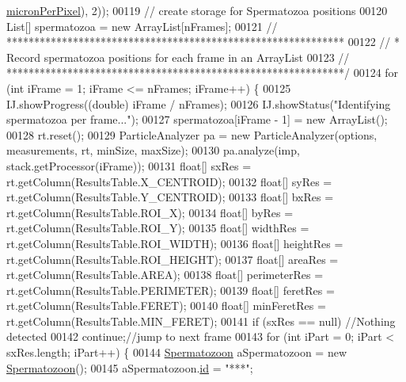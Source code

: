 \begin{DoxyCode}
      \hyperlink{classdata_1_1_params_a19331ee97ef3c422984fc7dff976549e}{micronPerPixel}), 2));
00119     \textcolor{comment}{// create storage for Spermatozoa positions}
00120     List[] spermatozoa = \textcolor{keyword}{new} ArrayList[nFrames];
00121     \textcolor{comment}{// *************************************************************}
00122     \textcolor{comment}{// * Record spermatozoa positions for each frame in an ArrayList}
00123     \textcolor{comment}{// *************************************************************/}
00124     \textcolor{keywordflow}{for} (\textcolor{keywordtype}{int} iFrame = 1; iFrame <= nFrames; iFrame++) \{
00125       IJ.showProgress((\textcolor{keywordtype}{double}) iFrame / nFrames);
00126       IJ.showStatus(\textcolor{stringliteral}{"Identifying spermatozoa per frame..."});      
00127       spermatozoa[iFrame - 1] = \textcolor{keyword}{new} ArrayList();
00128       rt.reset();
00129       ParticleAnalyzer pa = \textcolor{keyword}{new} ParticleAnalyzer(options, measurements, rt, minSize, maxSize);
00130       pa.analyze(imp, stack.getProcessor(iFrame));
00131       \textcolor{keywordtype}{float}[] sxRes = rt.getColumn(ResultsTable.X\_CENTROID);
00132       \textcolor{keywordtype}{float}[] syRes = rt.getColumn(ResultsTable.Y\_CENTROID);
00133       \textcolor{keywordtype}{float}[] bxRes = rt.getColumn(ResultsTable.ROI\_X);
00134       \textcolor{keywordtype}{float}[] byRes = rt.getColumn(ResultsTable.ROI\_Y);
00135       \textcolor{keywordtype}{float}[] widthRes = rt.getColumn(ResultsTable.ROI\_WIDTH);
00136       \textcolor{keywordtype}{float}[] heightRes = rt.getColumn(ResultsTable.ROI\_HEIGHT);
00137       \textcolor{keywordtype}{float}[] areaRes = rt.getColumn(ResultsTable.AREA);
00138       \textcolor{keywordtype}{float}[] perimeterRes = rt.getColumn(ResultsTable.PERIMETER);
00139       \textcolor{keywordtype}{float}[] feretRes = rt.getColumn(ResultsTable.FERET);
00140       \textcolor{keywordtype}{float}[] minFeretRes = rt.getColumn(ResultsTable.MIN\_FERET);
00141       \textcolor{keywordflow}{if} (sxRes == null) \textcolor{comment}{//Nothing detected}
00142         \textcolor{keywordflow}{continue};\textcolor{comment}{//jump to next frame}
00143       \textcolor{keywordflow}{for} (\textcolor{keywordtype}{int} iPart = 0; iPart < sxRes.length; iPart++) \{
00144         \hyperlink{classdata_1_1_spermatozoon}{Spermatozoon} aSpermatozoon = \textcolor{keyword}{new} \hyperlink{classdata_1_1_spermatozoon}{Spermatozoon}();
00145         aSpermatozoon.\hyperlink{classdata_1_1_spermatozoon_a76010eef1edc0406cc2375c25d2a433d}{id} = \textcolor{stringliteral}{"***"};

\end{DoxyCode}
